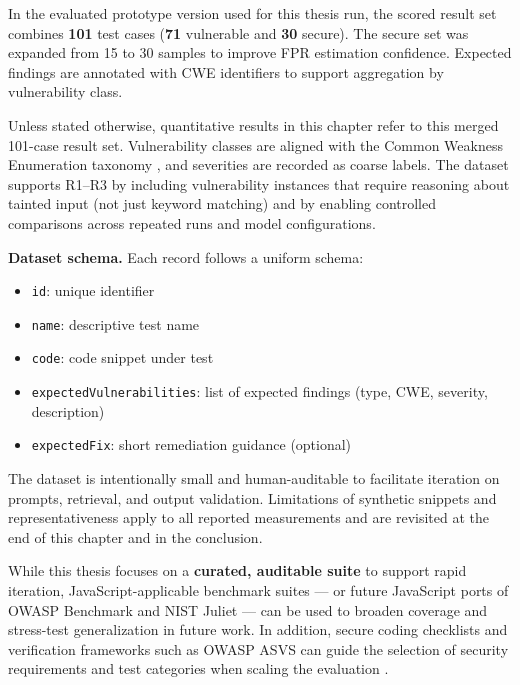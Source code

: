 In the evaluated prototype version used for this thesis run, the scored result set combines \textbf{101} test cases (\textbf{71} vulnerable and \textbf{30} secure). The secure set was expanded from 15 to 30 samples to improve FPR estimation confidence. Expected findings are annotated with CWE identifiers to support aggregation by vulnerability class.

Unless stated otherwise, quantitative results in this chapter refer to this merged 101-case result set. Vulnerability classes are aligned with the Common Weakness Enumeration taxonomy \cite{mitreCWE}, and severities are recorded as coarse labels. The dataset supports R1--R3 by including vulnerability instances that require reasoning about tainted input (not just keyword matching) and by enabling controlled comparisons across repeated runs and model configurations.

\noindent\textbf{Dataset schema.} Each record follows a uniform schema:
\begin{itemize}
  \item \texttt{id}: unique identifier
  \item \texttt{name}: descriptive test name
  \item \texttt{code}: code snippet under test
  \item \texttt{expectedVulnerabilities}: list of expected findings (type, CWE, severity, description)
  \item \texttt{expectedFix}: short remediation guidance (optional)
\end{itemize}

The dataset is intentionally small and human-auditable to facilitate iteration on prompts, retrieval, and output validation. Limitations of synthetic snippets and representativeness apply to all reported measurements and are revisited at the end of this chapter and in the conclusion.

While this thesis focuses on a \textbf{curated, auditable suite} to support rapid iteration, JavaScript-applicable benchmark suites --- or future JavaScript ports of OWASP Benchmark and NIST Juliet \cite{owaspBenchmark,nistJuliet} --- can be used to broaden coverage and stress-test generalization in future work. In addition, secure coding checklists and verification frameworks such as OWASP ASVS can guide the selection of security requirements and test categories when scaling the evaluation \cite{owaspASVS}.
